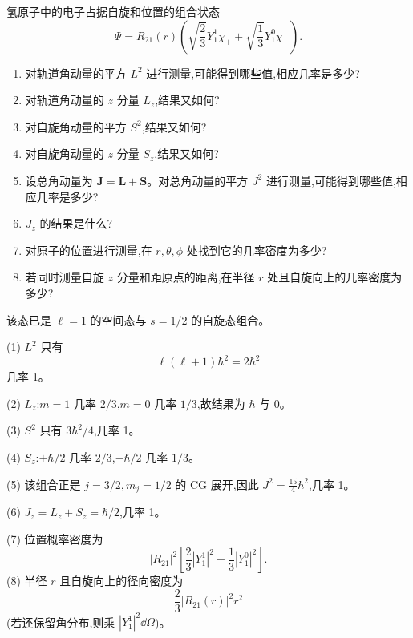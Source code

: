 \begin{question}
氢原子中的电子占据自旋和位置的组合状态
\[
\Psi=R_{21}(r)\left(\sqrt{\frac23}Y_1^1\chi_+ +\sqrt{\frac13}Y_1^0\chi_-\right).
\]
\begin{enumerate}
\item 对轨道角动量的平方 $L^2$ 进行测量,可能得到哪些值,相应几率是多少?
\item 对轨道角动量的 $z$ 分量 $L_z$,结果又如何?
\item 对自旋角动量的平方 $S^2$,结果又如何?
\item 对自旋角动量的 $z$ 分量 $S_z$,结果又如何?
\item 设总角动量为 $\mathbf J=\mathbf L+\mathbf S$。对总角动量的平方 $J^2$ 进行测量,可能得到哪些值,相应几率是多少?
\item $J_z$ 的结果是什么?
\item 对原子的位置进行测量,在 $r,\theta,\phi$ 处找到它的几率密度为多少?
\item 若同时测量自旋 $z$ 分量和距原点的距离,在半径 $r$ 处且自旋向上的几率密度为多少?
\end{enumerate}
\end{question}
\begin{solution}

该态已是 $\ell=1$ 的空间态与 $s=1/2$ 的自旋态组合。

(1) $L^2$ 只有
\[
\ell(\ell+1)
\hbar^2=2\hbar^2
\]
几率 1。

(2) $L_z$:$m=1$ 几率 $2/3$,$m=0$ 几率 $1/3$,故结果为 $\hbar$ 与 $0$。

(3) $S^2$ 只有 $3\hbar^2/4$,几率 1。

(4) $S_z$:$+\hbar/2$ 几率 $2/3$,$-\hbar/2$ 几率 $1/3$。

(5) 该组合正是 $j=3/2,m_j=1/2$ 的 CG 展开,因此 $J^2=\frac{15}{4}\hbar^2$,几率 1。

(6) $J_z=L_z+S_z=\hbar/2$,几率 1。

(7) 位置概率密度为
\[
|R_{21}|^2\left[\frac23|Y_1^1|^2+\frac13|Y_1^0|^2\right].
\]
(8) 半径 $r$ 且自旋向上的径向密度为
\[
\frac23 |R_{21}(r)|^2r^2
\]
(若还保留角分布,则乘 $|Y_1^1|^2\dd\Omega$)。

\end{solution}

